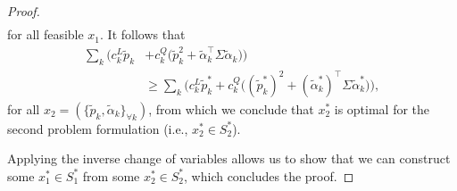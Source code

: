 \documentclass{article}
\begin{document}
\begin{proof}
\begin{align*}
\end{align*}
for all feasible $x_1$. It follows that 
\begin{align*}
\sum_k \Big(c_k^L \tilde{p}_k & + c_k^Q \Big(\tilde{p}_k^2 + \tilde{\alpha}_k^\top \Sigma \tilde{\alpha}_k\Big)\Big)\\
&\ge \sum_k \Big(c_k^L \tilde{p}_k^* + c_k^Q \Big((\tilde{p}_k^*)^2 + (\tilde{\alpha}_k^*)^\top \Sigma \tilde{\alpha}_k^*\Big)\Big),
\end{align*}
for all $x_2 = (\{\tilde{p}_k, \tilde{\alpha}_k\}_{\forall k})$, from which we conclude that $x_2^*$ is optimal for the second problem formulation (i.e., $x_2^* \in S_2^*$). 

Applying the inverse change of variables allows us to show that we can construct some $x_1^* \in S_1^*$ from some $x_2^* \in S_2^*$, which concludes the proof.
\end{proof}


\end{document}
